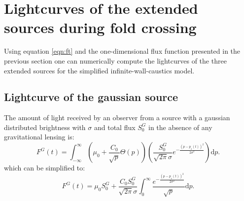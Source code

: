 \documentclass[usenatbib]{mn2e}
\begin{document}
\section{Lightcurves of the extended sources during fold crossing}\label{sec:fold-crossing}

Using equation \ref{eqn:ft} and the one-dimensional flux function
presented in the previous section one can numerically compute the
lightcurves of the three extended sources for the simplified
infinite-wall-caustics model.

\subsection{Lightcurve of the gaussian source}

The amount of light received by an observer from a source 
with a gaussian distributed brightness with $\sigma$ and total flux $S_0^G$ in the absence of any gravitational lensing is:
\begin{equation}
 F^G(t) = \int_{-\infty}^\infty  \left( \mu_0 + \frac{C_0}{\sqrt{p}} \Theta \left( p \right) \right) \left( \frac{S_0^G}{\sqrt{2 \pi} \sigma} e^{-\frac{(p-p_s(t))^2}{2 \sigma^2}} \right) \mathrm{d}p.
\end{equation}
which can be simplified to:
\begin{equation}
 F^G(t) = \mu_0 S_0^G + \frac{C_0 S_0^G}{\sqrt{2\pi} \sigma} \int_{0}^\infty \frac{e^{-\frac{(p-p_s(t))^2}{2 \sigma^2}}}{\sqrt{p}} \mathrm{d}p.
\end{equation}
\end{document}
